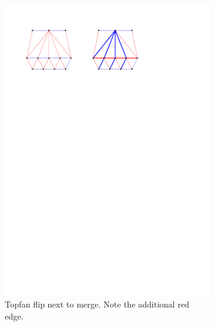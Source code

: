 \begin{figure}[!b]
\begin{subfigure}[b]{0.45 \textwidth}
        \includegraphics[width =\textwidth]{topFanFlips/img/mergeend}
        \caption{Topfan flip next to merge. Note the additional red edge.}
        \label{fig:fanflip:mergeLastVertex}
    \end{subfigure}
    \centering
    \begin{subfigure}[b]{0.45 \textwidth}

\end{subfigure}
\end{figure}
